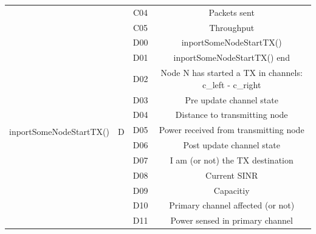 \documentclass[a4paper]{article}
\begin{document}
\begin{table}[]
\begin{tabular}{|c|c|c|c|}
                                           &                     & C04               & Packets sent                                            \\ \cline{3-4} 
                                           &                     & C05               & Throughput                                              \\ \hline
\multirow{14}{*}{inportSomeNodeStartTX()}  & \multirow{14}{*}{D} & D00               & inportSomeNodeStartTX()                                 \\ \cline{3-4} 
                                           &                     & D01               & inportSomeNodeStartTX() end                             \\ \cline{3-4} 
                                           &                     & D02               & Node N has started a TX in channels: c\_left - c\_right \\ \cline{3-4} 
                                           &                     & D03               & Pre update channel state                                \\ \cline{3-4} 
                                           &                     & D04               & Distance to transmitting node                           \\ \cline{3-4} 
                                           &                     & D05               & Power received from transmitting node                   \\ \cline{3-4} 
                                           &                     & D06               & Post update channel state                               \\ \cline{3-4} 
                                           &                     & D07               & I am (or not) the TX destination                        \\ \cline{3-4} 
                                           &                     & D08               & Current SINR                                            \\ \cline{3-4} 
                                           &                     & D09               & Capacitiy                                               \\ \cline{3-4} 
                                           &                     & D10               & Primary channel affected (or not)                       \\ \cline{3-4} 
                                           &                     & D11               & Power sensed in primary channel                         \\ \cline{3-4} 

\end{tabular}
\end{table}
\end{document}
